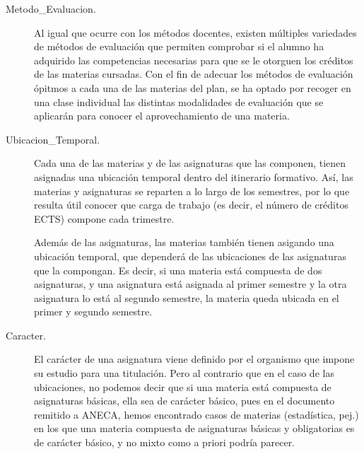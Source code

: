 \begin{description}
		\item[Metodo\_Evaluacion.]Al igual que ocurre con los métodos docentes, existen múltiples variedades de métodos de evaluación que permiten comprobar si el alumno ha adquirido las competencias necesarias para que se le otorguen los créditos de las materias cursadas. Con el fin de adecuar los métodos de evaluación ópitmos a cada una de las materias del plan, se ha optado por recoger en una clase individual las distintas modalidades de evaluación que se aplicarán para conocer el aprovechamiento de una materia.
			


		\item[Ubicacion\_Temporal.]Cada una de las materias y de las asignaturas que las componen, tienen asignadas una ubicación temporal dentro del itinerario formativo. Así, las materias y asignaturas se reparten a lo largo de los semestres, por lo que resulta útil conocer que carga de trabajo (es decir, el número de créditos ECTS) compone cada trimestre.

		Además de las asignaturas, las materias también tienen asigando una ubicación temporal, que dependerá de las ubicaciones de las asignaturas que la compongan. Es decir, si una materia está compuesta de dos asignaturas, y una asignatura está asignada al primer semestre y la otra asignatura lo está al segundo semestre, la materia queda ubicada en el primer y segundo semestre.
			
    	
    	
		\item[Caracter.]	El carácter de una asignatura viene definido por el organismo que impone su estudio para una titulación. Pero al contrario que en el caso de las ubicaciones, no podemos decir que si una materia está compuesta de asignaturas básicas, ella sea de carácter básico, pues en el documento remitido a ANECA, hemos encontrado casos de materias (estadística, pej.) en los que una materia compuesta de asignaturas básicas y obligatorias es de carácter básico, y no mixto como a priori podría parecer. 
			
    	
    	
	\end{description}

